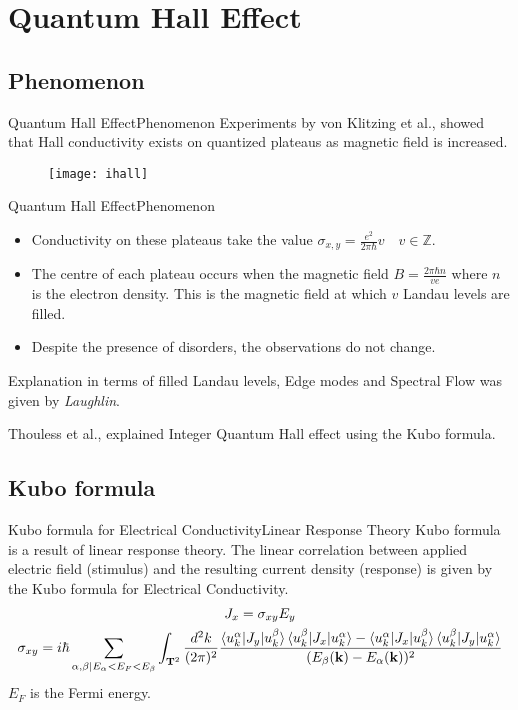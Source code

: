 \documentclass{beamer}
\begin{document}
\section{Quantum Hall Effect}
\subsection{Phenomenon}
\begin{frame}{Quantum Hall Effect}{Phenomenon}
Experiments by von Klitzing et al., showed that Hall conductivity exists on quantized plateaus as magnetic field is increased.
\begin{figure}[h]
 \centering
 \texttt{[image: ihall]}
\end{figure}
\end{frame}
\begin{frame}{Quantum Hall Effect}{Phenomenon}
\begin{itemize}
 \item Conductivity on these plateaus take the value $\sigma_{x,y} = \frac{e^2}{2\pi\hbar}v \quad v \in \mathbb{Z}$.
 \item The centre of each plateau occurs when the magnetic field $B = \frac{2\pi\hbar n}{ve}$ where $n$ is the electron density. This is the magnetic field at which
 $v$ Landau levels are filled.
 \item Despite the presence of disorders, the observations do not change.
\end{itemize}
 Explanation in terms of filled Landau levels, Edge modes and Spectral Flow was given by \emph{Laughlin}.
 
 Thouless et al., explained Integer Quantum Hall effect using the \alert{Kubo formula}.
\end{frame}

\subsection{Kubo formula}
\begin{frame}{Kubo formula for Electrical Conductivity}{Linear Response Theory}
 Kubo formula is a result of linear response theory. The linear correlation between applied electric field (stimulus) and the resulting current density (response) is given by
 the Kubo formula for Electrical Conductivity.\footnotesize
 \begin{gather}
 J_{x} = \sigma_{xy} E_{y} \\
 \sigma_{xy} = i\hbar \sum_{\alpha,\beta | E_{\alpha}<E_{F}<E_{\beta}}\int_{\mathbf{T}^2}\frac{d^2 k}{(2\pi)^2} \frac{\braket{u_k^\alpha |J_{y}|u_k^\beta}\braket{u_k^\beta |J_{x}|u_k^\alpha} - \braket{u_k^\alpha |J_{x}|u_k^\beta}\braket{u_k^\beta |J_{y}|u_k^\alpha}}{(E_{\beta}(\mathbf{k})-E_{\alpha}(\mathbf{k}))^2}
\end{gather}\normalsize
$E_{F}$ is the Fermi energy.
\end{frame}
\end{document}
